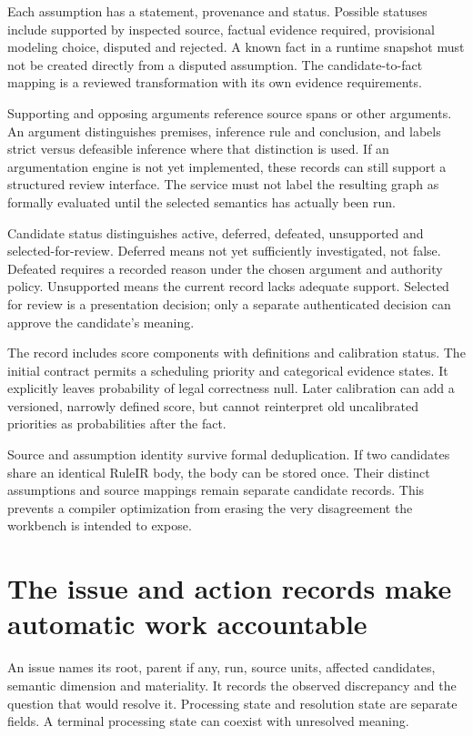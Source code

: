 \documentclass[12pt,a4paper,oneside,openany]{book}
\begin{document}
Each assumption has a statement, provenance and status. Possible statuses include
supported by inspected source, factual evidence required, provisional modeling
choice, disputed and rejected. A known fact in a runtime snapshot must not be
created directly from a disputed assumption. The candidate-to-fact mapping is a
reviewed transformation with its own evidence requirements.

Supporting and opposing arguments reference source spans or other arguments.
An argument distinguishes premises, inference rule and conclusion, and labels
strict versus defeasible inference where that distinction is used. If an
argumentation engine is not yet implemented, these records can still support a
structured review interface. The service must not label the resulting graph as
formally evaluated until the selected semantics has actually been run.

Candidate status distinguishes active, deferred, defeated, unsupported and
selected-for-review. Deferred means not yet sufficiently investigated, not false.
Defeated requires a recorded reason under the chosen argument and authority
policy. Unsupported means the current record lacks adequate support. Selected
for review is a presentation decision; only a separate authenticated decision can
approve the candidate's meaning.

The record includes score components with definitions and calibration status.
The initial contract permits a scheduling priority and categorical evidence
states. It explicitly leaves probability of legal correctness null. Later
calibration can add a versioned, narrowly defined score, but cannot reinterpret
old uncalibrated priorities as probabilities after the fact.

Source and assumption identity survive formal deduplication. If two candidates
share an identical RuleIR body, the body can be stored once. Their distinct
assumptions and source mappings remain separate candidate records. This prevents
a compiler optimization from erasing the very disagreement the workbench is
intended to expose.

\section{The issue and action records make automatic work accountable}

An issue names its root, parent if any, run, source units, affected candidates,
semantic dimension and materiality. It records the observed discrepancy and the
question that would resolve it. Processing state and resolution state are separate
fields. A terminal processing state can coexist with unresolved meaning.
\end{document}
